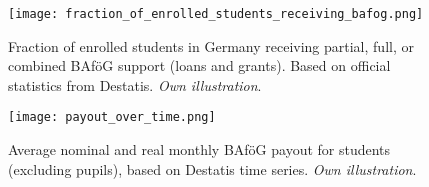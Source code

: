 \begin{figure}[H]
  \centering
  \begin{minipage}[t]{0.48\textwidth}
    \centering
    \texttt{[image: fraction\_of\_enrolled\_students\_receiving\_bafog.png]}
    \caption{
      Fraction of enrolled students in Germany receiving partial, full, or combined BAföG support (loans and grants). Based on official statistics from Destatis. \textit{Own illustration}.
    }
    \label{figure:bafoeg_support}
  \end{minipage}%
  \hfill
  \begin{minipage}[t]{0.48\textwidth}
    \centering
    \texttt{[image: payout\_over\_time.png]}
    \caption{
      Average nominal and real monthly BAföG payout for students (excluding pupils), based on Destatis time series. \textit{Own illustration}.
    }
    \label{figure:payout_over_time}
  \end{minipage}

\end{figure}
